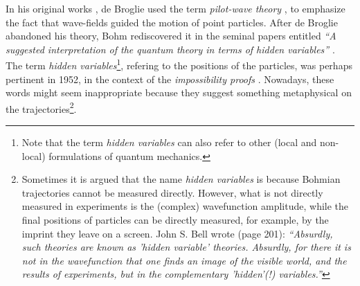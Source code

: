 \documentclass[onecolumn,nofootinbib, secnumarabic, amsmath, nobibnotes,12pt,aps,pra]{revtex4-1}
\begin{document}
In his original works \cite{om.dB_AnnPhys,om.debroglie1927b}, de Broglie used the term \emph{pilot-wave theory} \cite{om.Valentini2006}, to emphasize the fact that wave-fields guided the motion of point particles.
After de Broglie abandoned his theory, Bohm rediscovered it in the seminal papers entitled \emph{``A suggested interpretation of the quantum theory in terms of hidden variables''} \cite{om.bohm1952a,om.bohm1952b}.
The term \emph{hidden variables}\footnote{Note that the term \emph{hidden variables} can also refer to other (local and non-local) formulations of quantum mechanics.}, refering to the  positions of the particles, was perhaps pertinent in 1952, in the context of the \emph{impossibility proofs} \cite{om.impossibility_proofs}.
Nowadays, these words might seem inappropriate because they suggest something metaphysical on the trajectories\footnote{Sometimes it is argued that the name \emph{hidden variables} is because Bohmian trajectories cannot be measured directly. However, what is not directly measured in experiments is the (complex) wavefunction amplitude, while the final positions of particles can be directly measured, for example, by the imprint they leave on a screen. John S. Bell wrote \cite{om.Bell1987} (page 201): \emph{``Absurdly, such theories are known as 'hidden variable' theories. Absurdly, for there it is not in the wavefunction that one finds an image of the visible world, and the results of experiments, but in the complementary 'hidden'(!) variables.''}}.
\end{document}
